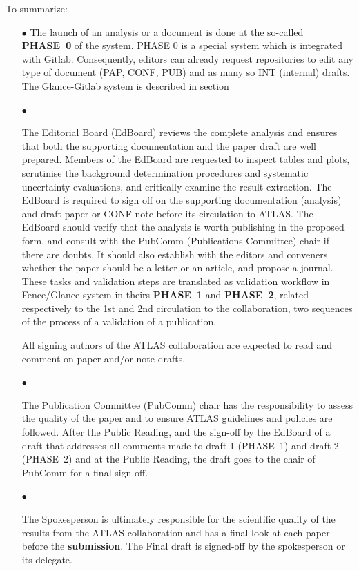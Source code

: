 To summarize:
\begin{itemize}

    \item[\tiny$\bullet$]
The launch of an analysis or a document is done at the so-called \textbf{PHASE~0} of the system. PHASE 0 is a special system which is integrated with Gitlab. Consequently, editors can already request repositories to edit any type of document (PAP, CONF, PUB) and as many so INT (internal)  drafts. The Glance-Gitlab system is described in section{}

    \item[\tiny$\bullet$]
    
The Editorial Board (EdBoard) reviews the complete analysis and ensures that both the supporting documentation and the paper draft are well prepared. Members of the EdBoard are requested to inspect tables and plots, scrutinise the background determination procedures and systematic uncertainty evaluations, and critically examine the result extraction. The EdBoard is required to sign off on the supporting documentation (analysis) and draft paper or CONF note before its circulation to ATLAS. The EdBoard should verify that the analysis is worth publishing in the proposed form, and consult with the PubComm (Publications Committee) chair if there are doubts. It should also establish with the editors and conveners whether the paper should be a letter or an article, and propose a journal. These tasks and validation steps are translated as validation workflow in Fence/Glance system in theirs \textbf{PHASE~1} and \textbf{PHASE~2}, related respectively to the 1st and 2nd circulation to the collaboration, two sequences of the process of a validation of a publication.

All signing authors of the ATLAS collaboration are expected to read and comment on paper and/or note drafts.

    \item[\tiny$\bullet$]

The Publication Committee (PubComm) chair has the responsibility to assess the quality of the paper and to ensure ATLAS guidelines and policies are followed. After the Public Reading, and the sign-off by the EdBoard of a draft  that addresses all comments made to draft-1 (PHASE~1) and draft-2 (PHASE~2)  and at the Public Reading, the draft goes to the chair of PubComm for a final sign-off.

    \item[\tiny$\bullet$]

The Spokesperson is ultimately responsible for the scientific quality of the results from the ATLAS collaboration and has a final look at each paper before the \textbf{submission}. The Final draft  is signed-off by the spokesperson or its delegate. 


\end{itemize}
